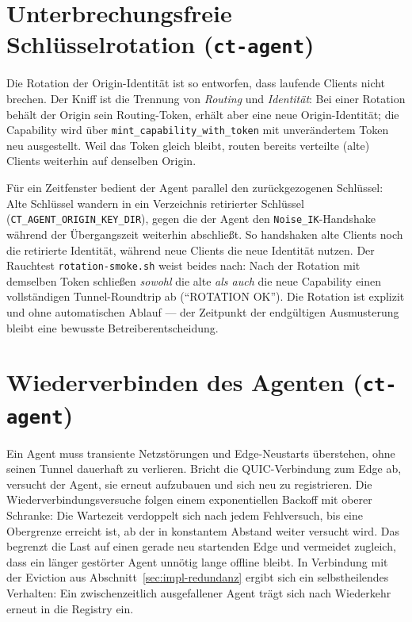 \section{Unterbrechungsfreie Schlüsselrotation (\texttt{ct-agent})}
\label{sec:impl-rotation}

Die Rotation der Origin-Identität ist so entworfen, dass laufende Clients nicht
brechen. Der Kniff ist die Trennung von \emph{Routing} und \emph{Identität}:
Bei einer Rotation behält der Origin sein Routing-Token, erhält aber eine neue
Origin-Identität; die Capability wird über \texttt{mint\_capability\_with\_token}
mit unverändertem Token neu ausgestellt. Weil das Token gleich bleibt, routen
bereits verteilte (alte) Clients weiterhin auf denselben Origin.

Für ein Zeitfenster bedient der Agent parallel den zurückgezogenen Schlüssel:
Alte Schlüssel wandern in ein Verzeichnis retirierter Schlüssel
(\texttt{CT\_AGENT\_ORIGIN\_KEY\_DIR}), gegen die der Agent den
\texttt{Noise\_IK}-Handshake während der Übergangszeit weiterhin abschließt. So
handshaken alte Clients noch die retirierte Identität, während neue Clients die
neue Identität nutzen. Der Rauchtest \texttt{rotation-smoke.sh} weist beides
nach: Nach der Rotation mit demselben Token schließen \emph{sowohl} die alte
\emph{als auch} die neue Capability einen vollständigen Tunnel-Roundtrip ab
(\enquote{ROTATION OK}). Die Rotation ist explizit und ohne automatischen
Ablauf --- der Zeitpunkt der endgültigen Ausmusterung bleibt eine bewusste
Betreiberentscheidung.

\section{Wiederverbinden des Agenten (\texttt{ct-agent})}
\label{sec:impl-reconnect}

Ein Agent muss transiente Netzstörungen und Edge-Neustarts überstehen, ohne
seinen Tunnel dauerhaft zu verlieren. Bricht die QUIC-Verbindung zum Edge ab,
versucht der Agent, sie erneut aufzubauen und sich neu zu registrieren. Die
Wiederverbindungsversuche folgen einem exponentiellen Backoff mit oberer
Schranke: Die Wartezeit verdoppelt sich nach jedem Fehlversuch, bis eine
Obergrenze erreicht ist, ab der in konstantem Abstand weiter versucht wird. Das
begrenzt die Last auf einen gerade neu startenden Edge und vermeidet zugleich,
dass ein länger gestörter Agent unnötig lange offline bleibt. In Verbindung mit
der Eviction aus Abschnitt~\ref{sec:impl-redundanz} ergibt sich ein
selbstheilendes Verhalten: Ein zwischenzeitlich ausgefallener Agent trägt sich
nach Wiederkehr erneut in die Registry ein.

